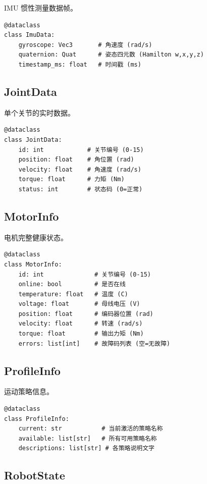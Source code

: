 \documentclass[a4paper,11pt,openany]{book}
\begin{document}
IMU 惯性测量数据帧。

\begin{lstlisting}[style=python]
@dataclass
class ImuData:
    gyroscope: Vec3       # 角速度 (rad/s)
    quaternion: Quat      # 姿态四元数 (Hamilton w,x,y,z)
    timestamp_ms: float   # 时间戳 (ms)
\end{lstlisting}

\subsection{JointData}

单个关节的实时数据。

\begin{lstlisting}[style=python]
@dataclass
class JointData:
    id: int            # 关节编号 (0-15)
    position: float    # 角位置 (rad)
    velocity: float    # 角速度 (rad/s)
    torque: float      # 力矩 (Nm)
    status: int        # 状态码 (0=正常)
\end{lstlisting}

\subsection{MotorInfo}

电机完整健康状态。

\begin{lstlisting}[style=python]
@dataclass
class MotorInfo:
    id: int              # 关节编号 (0-15)
    online: bool         # 是否在线
    temperature: float   # 温度 (C)
    voltage: float       # 母线电压 (V)
    position: float      # 编码器位置 (rad)
    velocity: float      # 转速 (rad/s)
    torque: float        # 输出力矩 (Nm)
    errors: list[int]    # 故障码列表 (空=无故障)
\end{lstlisting}

\subsection{ProfileInfo}

运动策略信息。

\begin{lstlisting}[style=python]
@dataclass
class ProfileInfo:
    current: str           # 当前激活的策略名称
    available: list[str]   # 所有可用策略名称
    descriptions: list[str] # 各策略说明文字
\end{lstlisting}

\subsection{RobotState}
\end{document}
